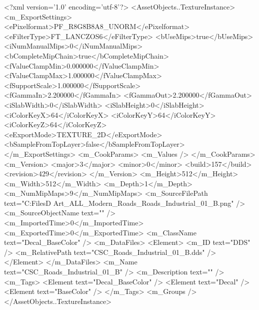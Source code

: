 <?xml version='1.0' encoding='utf-8'?>
<AssetObjects..TextureInstance>
  <m_ExportSettings>
    <ePixelformat>PF_R8G8B8A8_UNORM</ePixelformat>
    <eFilterType>FT_LANCZOS6</eFilterType>
    <bUseMips>true</bUseMips>
    <iNumManualMips>0</iNumManualMips>
    <bCompleteMipChain>true</bCompleteMipChain>
    <fValueClampMin>0.000000</fValueClampMin>
    <fValueClampMax>1.000000</fValueClampMax>
    <fSupportScale>1.000000</fSupportScale>
    <fGammaIn>2.200000</fGammaIn>
    <fGammaOut>2.200000</fGammaOut>
    <iSlabWidth>0</iSlabWidth>
    <iSlabHeight>0</iSlabHeight>
    <iColorKeyX>64</iColorKeyX>
    <iColorKeyY>64</iColorKeyY>
    <iColorKeyZ>64</iColorKeyZ>
    <eExportMode>TEXTURE_2D</eExportMode>
    <bSampleFromTopLayer>false</bSampleFromTopLayer>
  </m_ExportSettings>
  <m_CookParams>
    <m_Values />
  </m_CookParams>
  <m_Version>
    <major>3</major>
    <minor>0</minor>
    <build>157</build>
    <revision>429</revision>
  </m_Version>
  <m_Height>512</m_Height>
  <m_Width>512</m_Width>
  <m_Depth>1</m_Depth>
  <m_NumMipMaps>9</m_NumMipMaps>
  <m_SourceFilePath text="C:\Users\Shadow\Desktop\Working Files\3D Art\Decals\CSC_ALL_Modern_Roads\textures\CSC_Roads_Industrial_01_B.png" />
  <m_SourceObjectName text="" />
  <m_ImportedTime>0</m_ImportedTime>
  <m_ExportedTime>0</m_ExportedTime>
  <m_ClassName text="Decal_BaseColor" />
  <m_DataFiles>
    <Element>
      <m_ID text="DDS" />
      <m_RelativePath text="CSC_Roads_Industrial_01_B.dds" />
    </Element>
  </m_DataFiles>
  <m_Name text="CSC_Roads_Industrial_01_B" />
  <m_Description text="" />
  <m_Tags>
    <Element text="Decal_BaseColor" />
    <Element text="Decal" />
    <Element text="BaseColor" />
  </m_Tags>
  <m_Groups />
</AssetObjects..TextureInstance>